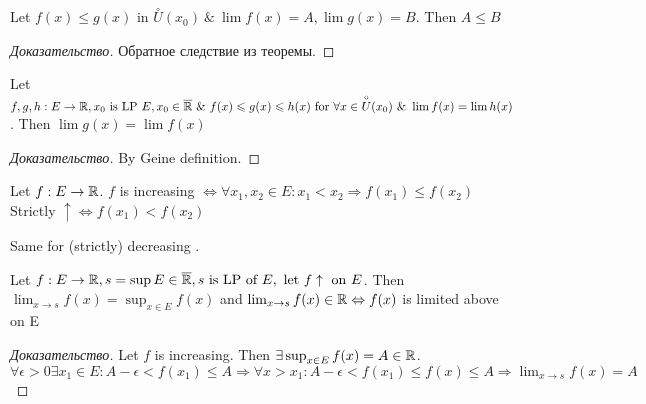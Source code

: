 \begin{corollary}
	Let $f(x) \leq g(x) \text{ in } \overset{\circ} U(x_0) \ \& \ \lim f(x) = A, \lim g(x) = B$. Then $A \leq B$ 
\end{corollary}
\begin{proof}[Доказательство]
	Обратное следствие из теоремы.
\end{proof}

\begin{theorem}[милиционеры))))))))))))))))]
	 Let $f,g,h: E \to \mathbb{R}, x_0 \text{ is LP } E, x_0 \in \overline{\mathbb{R}} \ \& \ f(x) \leqslant g(x) \leqslant h(x) \text{ for } \forall x \in \overset{\circ} U(x_0) \ \& \ \lim f(x) = \lim h(x)$. Then $\lim g(x) = \lim f(x)$
\end{theorem}
\begin{proof}[Доказательство]
	By Geine definition.
\end{proof}

\begin{definition}[]
	Let $f: E \to \mathbb{R}$.  $f$ is increasing $\Leftrightarrow \forall x_1, x_2 \in E: x_1 < x_2 \Rightarrow f(x_1) \leq f(x_2)$
	Strictly $\uparrow \Leftrightarrow f(x_1) < f(x_2)$
\end{definition}

Same for (strictly) decreasing \smiley.

\begin{theorem}[Weierstrass]
	Let $f: E \to \mathbb{R}, s = \sup E \in \overline{\mathbb{R}}, s \text{ is LP of } E, \text{ let } f \uparrow \text{ on } E$. Then $\lim_{x \to s} f(x) = \sup_{x \in E}f(x)$ and $\lim_{x \to s} f(x) \in \mathbb{R} \Leftrightarrow f(x)$ is limited above on E
\end{theorem}
\begin{proof}[Доказательство]
	Let $f$ is increasing. Then $\exists \sup_{x \in E} f(x) = A \in \mathbb{R}$. $\forall \epsilon > 0 \exists x_1 \in E: A - \epsilon < f(x_1) \leq A \Rightarrow \forall x >x_1: A - \epsilon < f(x_1) \leq f(x) \leq A \Rightarrow \lim_{x \to s} f(x) = A$
\end{proof}

